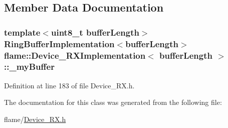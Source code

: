 \subsection{Member Data Documentation}
\hypertarget{classflame_1_1_device___r_x_implementation_a33418a9bb5a111865955284a78e38cac}{
\subsubsection[{\-\_\-my\-Buffer}]{\setlength{\rightskip}{0pt plus 5cm}template$<$uint8\-\_\-t buffer\-Length$>$ {\bf Ring\-Buffer\-Implementation}$<$buffer\-Length$>$ {\bf flame\-::\-Device\-\_\-\-R\-X\-Implementation}$<$ buffer\-Length $>$\-::\-\_\-my\-Buffer\hspace{0.3cm}{\ttfamily [protected]}}}\label{classflame_1_1_device___r_x_implementation_a33418a9bb5a111865955284a78e38cac}


Definition at line 183 of file Device\-\_\-\-R\-X.\-h.



The documentation for this class was generated from the following file\-:\begin{DoxyCompactItemize}
\item 
flame/\hyperlink{_device___r_x_8h}{Device\-\_\-\-R\-X.\-h}\end{DoxyCompactItemize}
